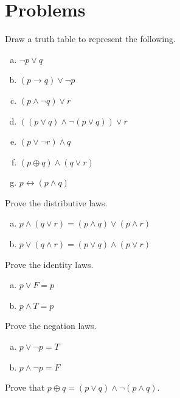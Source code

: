\section{Problems}

\begin{pro}\label{pro:booExp}
Draw a truth table to represent the following.
\begin{enumerate}[(a)]
\item $\neg p \vee q$
\item $(p\rightarrow q) \vee \neg p$
\item $(p\wedge \neg q)\vee r$
\item $((p\vee q) \wedge\neg(p\vee q))\vee r$
\item $(p\vee\neg r)\wedge q$
\item $(p\oplus q)\wedge (q\vee r)$
\item $p\leftrightarrow (p\wedge q)$
\end{enumerate}
\end{pro}

\begin{pro}
Prove the distributive laws.
\begin{enumerate}[(a)]
\item
$p\wedge(q\vee r) = (p\wedge q) \vee (p\wedge r)$
\item
$p\vee(q\wedge r) = (p\vee q)\wedge(p\vee r)$
\end{enumerate}
\end{pro}

\begin{pro}
Prove the identity laws.
\begin{enumerate}[(a)]
\item
$p \vee F = p$ 
\item
 $p\wedge T = p$
\end{enumerate}
\end{pro}

\begin{pro}
Prove the negation laws.
\begin{enumerate}[(a)]
\item
$p\vee \neg p = T$ 
\item
 $p\wedge\neg p = F$
\end{enumerate}
\end{pro}

\begin{pro}
Prove that $p\oplus q = (p\vee q)\wedge \neg(p\wedge q)$.
\end{pro}

